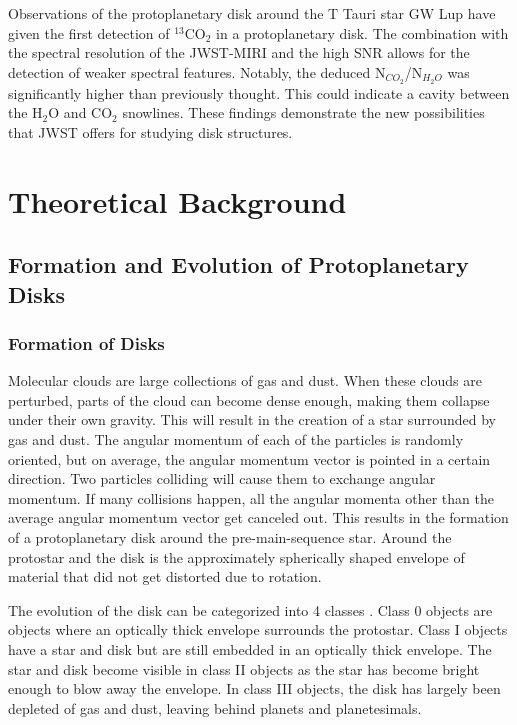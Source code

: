 \documentclass[twoside, single, authoryear, semicolon, 12pt]{lion-msc}
\newcommand{\4}{$_4$}
\newcommand{\3}{$_3$}
\newcommand{\2}{$_2$}
\begin{document}
Observations of the protoplanetary disk around the T Tauri star GW Lup have given the first detection of $^{13}$CO$_2$ in a protoplanetary disk. \cite{Grant_2023} The combination with the spectral resolution of the JWST-MIRI and the high SNR allows for the detection of weaker spectral features. Notably, the deduced N$_{CO_2}$/N$_{H_2O}$ was significantly higher than previously thought. This could indicate a cavity between the H$_2$O and CO$_2$ snowlines. These findings demonstrate the new possibilities that JWST offers for studying disk structures. 


\chapter{Theoretical Background}
\section{Formation and Evolution of Protoplanetary Disks}
\subsection{Formation of Disks}
Molecular clouds are large collections of gas and dust. When these clouds are perturbed, parts of the cloud can become dense enough, making them collapse under their own gravity. This will result in the creation of a star surrounded by gas and dust. The angular momentum of each of the particles is randomly oriented, but on average, the angular momentum vector is pointed in a certain direction. Two particles colliding will cause them to exchange angular momentum. If many collisions happen, all the angular momenta other than the average angular momentum vector get canceled out. This results in the formation of a protoplanetary disk around the pre-main-sequence star. Around the protostar and the disk is the approximately spherically shaped envelope of material that did not get distorted due to rotation. 

The evolution of the disk can be categorized into 4 classes \citep{1987ApJ...312..788A}. Class 0 objects are objects where an optically thick envelope surrounds the protostar. Class I objects have a star and disk but are still embedded in an optically thick envelope. The star and disk become visible in class II objects as the star has become bright enough to blow away the envelope. In class III objects, the disk has largely been depleted of gas and dust, leaving behind planets and planetesimals. 
\end{document}
